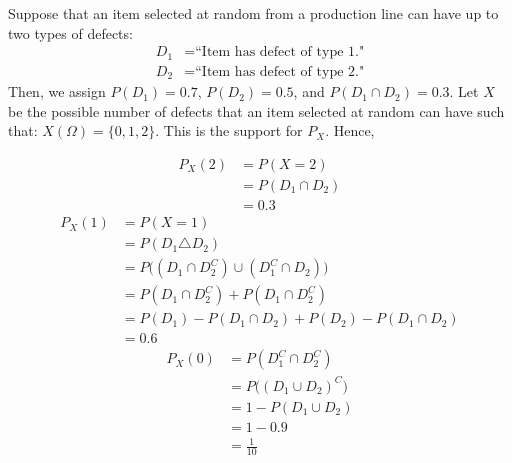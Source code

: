 \documentclass{article}
\begin{document}
	\begin{exmp}
		Suppose that an item selected at random from a production line can have up to two types of defects:
		\begin{align*}
			D_1 &= \text{``Item has defect of type 1."} \\
			D_2 &= \text{``Item has defect of type 2."}
		\end{align*}
		Then, we assign $P(D_1) = 0.7$, $P(D_2) = 0.5$, and $P(D_1 \cap D_2) = 0.3$. Let $X$ be the possible number of defects that an item selected at random can have such that:
		$X(\Omega) = \{0,1,2 \}$. This is the support for $P_X$. Hence,
		
		\begin{align*}
			P_X(2) &= P(X=2) \\
			&= P(D_1 \cap D_2) \\
			&= 0.3
		\end{align*}
		\begin{align*}
			P_X(1) &= P(X=1) \\
			&= P(D_1 \triangle D_2) \\
			&= P \big( (D_1 \cap D_2^C ) \cup (D_1^C \cap D_2)\big) \\
			&= P(D_1 \cap D_2^C) + P(D_1 \cap D_2^C)\\
			&= P(D_1) - P(D_1 \cap D_2) + P(D_2) - P(D_1 \cap D_2) \\
			&= 0.6
		\end{align*}
		\begin{align*}
			P_X(0) &= P(D_1^C \cap D_2^C) \\
			&= P\big( (D_1 \cup D_2)^C \big) \\
			&= 1 - P(D_1 \cup D_2)\\
			&= 1 - 0.9\\
			&= \frac{1}{10}
		\end{align*}
	\end{exmp}
\end{document}
